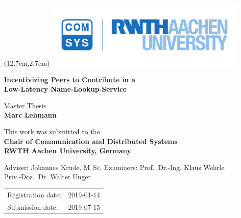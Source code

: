 
\titlehead{
} %


\begin{titlepage}

\begin{textblock*}{10cm} (12.7cm,2.7cm)
\includegraphics[width=10cm,keepaspectratio]{logos/rwth_comsys_bild_cmyk}
\end{textblock*}

\let\footnotesize\small \let\footnoterule\relax

\hbox{}
\vfill

\centering

\begin{doublespace}
{\huge\sffamily\textbf{Incentivizing Peers to Contribute in a \\[5pt]
                       Low-Latency Name-Lookup-Service}}
\end{doublespace}
\vskip 2cm

{\large\sffamily

Master Thesis\\[5pt]
\textbf{Marc Lehmann}
\vskip 1cm

This work was submitted to the\\[5pt]
\textbf{Chair of Communication and Distributed Systems\\[5pt]
        RWTH Aachen University, Germany}
\vskip 2cm

Adviser:
\vskip 2mm
Johannes Krude, M.$\,$Sc.
\vskip 5mm
Examiners:
\vskip 2mm
Prof.~Dr.-Ing. Klaus Wehrle\\
Priv.-Doz.~Dr. Walter Unger
\vskip 1cm

\begin{tabular}{R{6cm}p{6cm}}
Registration date:  & 2019-01-14 \\
Submission date:    & 2019-07-15 \\
\end{tabular}

} %

\vfill

\end{titlepage}
